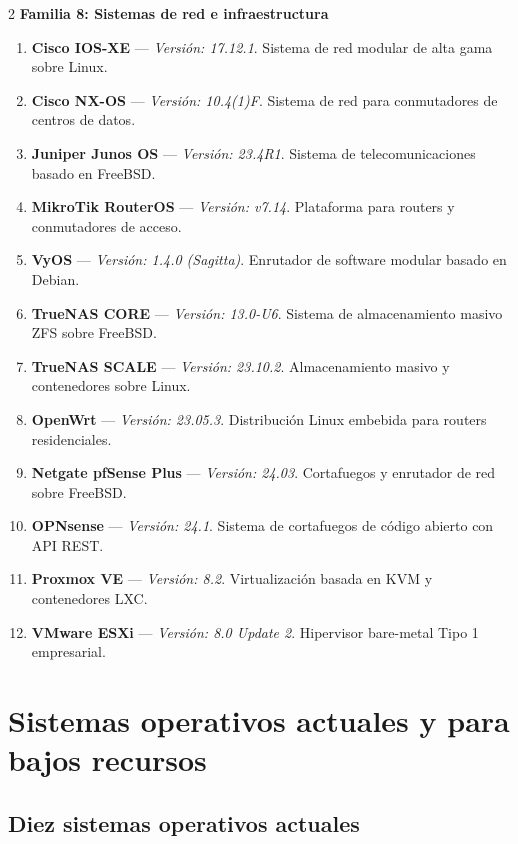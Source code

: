 \documentclass[12pt]{article}
\begin{document}
\begin{multicols}{2}
\medskip
\noindent\textbf{Familia 8: Sistemas de red e infraestructura}\par\smallskip
\begin{enumerate}[label=\textbf{\arabic*.}, leftmargin=*, noitemsep, topsep=1pt, start=109]
    \item \textbf{Cisco IOS-XE} --- \textit{Versión: 17.12.1}. Sistema de red modular de alta gama sobre Linux.
    \item \textbf{Cisco NX-OS} --- \textit{Versión: 10.4(1)F}. Sistema de red para conmutadores de centros de datos.
    \item \textbf{Juniper Junos OS} --- \textit{Versión: 23.4R1}. Sistema de telecomunicaciones basado en FreeBSD.
    \item \textbf{MikroTik RouterOS} --- \textit{Versión: v7.14}. Plataforma para routers y conmutadores de acceso.
    \item \textbf{VyOS} --- \textit{Versión: 1.4.0 (Sagitta)}. Enrutador de software modular basado en Debian.
    \item \textbf{TrueNAS CORE} --- \textit{Versión: 13.0-U6}. Sistema de almacenamiento masivo ZFS sobre FreeBSD.
    \item \textbf{TrueNAS SCALE} --- \textit{Versión: 23.10.2}. Almacenamiento masivo y contenedores sobre Linux.
    \item \textbf{OpenWrt} --- \textit{Versión: 23.05.3}. Distribución Linux embebida para routers residenciales.
    \item \textbf{Netgate pfSense Plus} --- \textit{Versión: 24.03}. Cortafuegos y enrutador de red sobre FreeBSD.
    \item \textbf{OPNsense} --- \textit{Versión: 24.1}. Sistema de cortafuegos de código abierto con API REST.
    \item \textbf{Proxmox VE} --- \textit{Versión: 8.2}. Virtualización basada en KVM y contenedores LXC.
    \item \textbf{VMware ESXi} --- \textit{Versión: 8.0 Update 2}. Hipervisor bare-metal Tipo 1 empresarial.
\end{enumerate}

\end{multicols}

\section{Sistemas operativos actuales y para bajos recursos}\label{sec:soActualesBajosRecursos}

\subsection{Diez sistemas operativos actuales}\label{sec:diezSoActuales}
\end{document}
